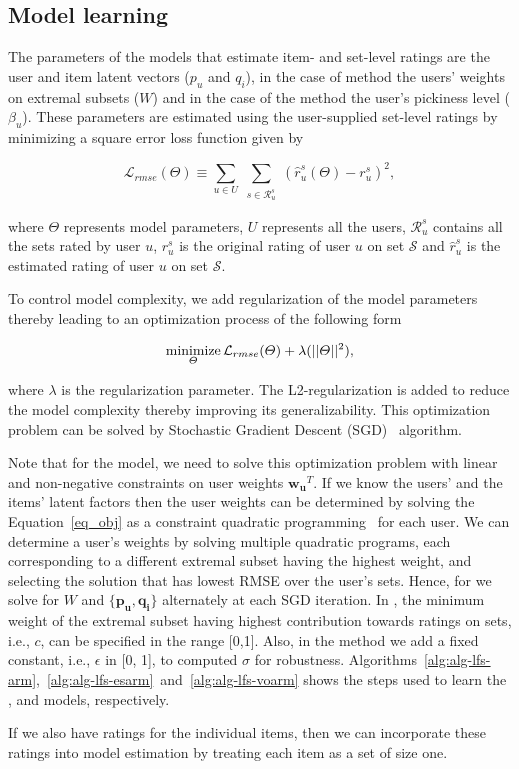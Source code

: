 \subsection{Model learning}\label{ch:lfs:model_learn}
The parameters of the models that estimate item- and set-level ratings are the
user and item latent vectors ($p_u$ and $q_i$), in the case of \ES method
the users' weights on extremal subsets ($W$) and in the case of the \VO method
the user's pickiness level ($\beta_u$). These parameters are estimated using the
user-supplied set-level ratings by minimizing a square error loss function given
by


%
\begin{equation} \label{eq_rmse}
  \mathcal{L}_{rmse}(\Theta) \equiv \sum_{u \in U} \sum_{\substack{s \in
  \mathcal{R}_{u}^s}} (\hat{r}_{u}^s(\Theta) - r_{u}^s)^2,
\end{equation}
%


\noindent where $\Theta$ represents model parameters, $U$ represents all the users, $\mathcal{R}_{u}^s$ contains all the sets rated 
by user $u$, $r_{u}^s$ is the original rating of user $u$ on set $\mathcal{S}$ 
and $\hat{r}_{u}^s$ is the estimated rating of user $u$ on set $\mathcal{S}$.

To control model complexity, we add regularization of the model parameters
thereby leading to an optimization process of the following form

%
\begin{equation} \label{eq_obj}
  \minimize_{\Theta} \mathcal{L}_{rmse}(\Theta)  + \lambda (||\Theta||^2),
\end{equation}

%
\noindent where $\lambda$ is the regularization parameter. The L2-regularization is added to 
reduce the model complexity thereby improving its generalizability. 
This optimization problem can be solved by Stochastic Gradient Descent
(SGD)~\cite{r22} algorithm. 


Note that for the \ES model, we
need to solve this optimization problem with linear and non-negative constraints
on user weights $\bm{w_u}^T$. If we know the users' and the items' latent factors
then the user weights can be determined by solving the Equation~\ref{eq_obj} as
a constraint quadratic programming~\cite{boyd2004convex} for each user. 
We can determine a user's weights by solving multiple quadratic programs, each
corresponding to a different extremal subset having the highest weight, and
selecting the solution that has lowest RMSE over the user's sets.
Hence, for \ES we solve for $W$ and $\{\bm{p_u}, \bm{q_i}\}$ alternately at each SGD iteration. 
In \ES, the minimum weight of the extremal subset having highest contribution towards
ratings on sets, i.e., $c$, can be specified in the range [0,1].
Also, in the \VO method 
we add a fixed constant, i.e., $\epsilon$ in [0, 1], to computed $\sigma$ for robustness.
Algorithms~\ref{alg:alg-lfs-arm},~\ref{alg:alg-lfs-esarm}~and~\ref{alg:alg-lfs-voarm}
shows the steps used to learn the \ARM,
\ES and \VO models, respectively.

If we also have ratings for the individual items, then we can incorporate these
ratings into model estimation by treating each item as a set of size one. 

